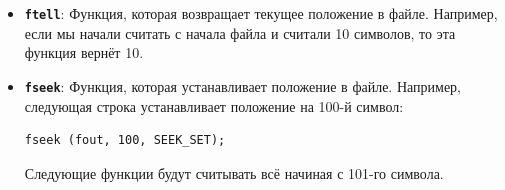 \documentclass{article}
\begin{document}
\begin{itemize}
\begin{lstlisting}
    while ((c = fgetc(f)) != EOF)
    {
        if (c >= '0' && c <= '9')
            num_of_digits += 1;
    }
    printf("Number of digits = %d\n", num_of_digits);
    fclose(f);
}
\end{lstlisting}
Эта программа содержится в файле \texttt{5number\_of\_digits.c}
\begin{itemize}
\item \textbf{Задача \#9:} Написать программу \texttt{symbolcount}, которая считает количество символов в файле. название файла должно передаваться через аргумент командной строки:\\
\begin{verbatim}
gcc -o symbolcount main.c
./symbolcount war_and_peace.txt
3332371
\end{verbatim}
\item \textbf{Задача \#10:} Написать программу \texttt{linecount}, которая находит количество строк в файле.
\item \textbf{Задача \#11:} Написать программу \texttt{wordcount}, которая находит количество слов в файле. Слово это любая последовательность символов, разделённая \textit{одним или несколькими} пробельными, символами. Пробельные символы это пробел, перенос на новую строку(\texttt{\textbackslash n}) либо табуляция(\texttt{\textbackslash t}).


\end{itemize}
\item \textbf{\texttt{ftell}}: Функция, которая возвращает текущее положение в файле. Например, если мы начали считать с начала файла и считали 10 символов, то эта функция вернёт 10.
\item \textbf{\texttt{fseek}}: Функция, которая устанавливает положение в файле. Например, следующая строка устанавливает положение на 100-й символ:
\begin{lstlisting}
fseek (fout, 100, SEEK_SET);
\end{lstlisting}
Следующие функции будут считывать всё начиная с 101-го символа.
\end{itemize}
\newpage
\end{document}
